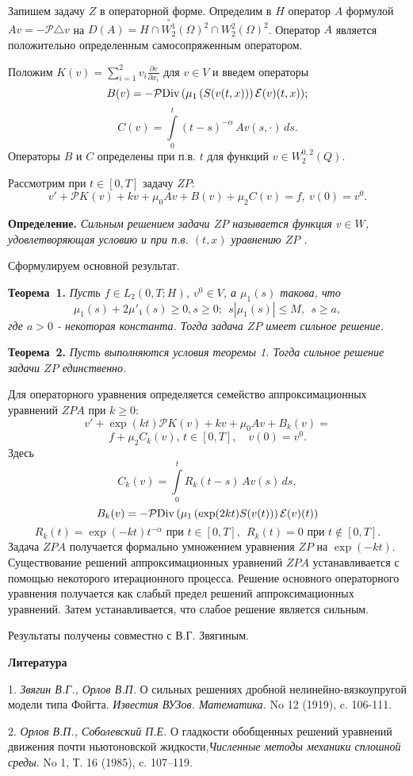 Запишем задачу  $Z$ в операторной форме.
 Определим в $H$ оператор $A$ формулой $Av=-{\mathcal{P}}\triangle v$ на $D(A)=H \cap \stackrel{\circ}{W_2^1}(\Omega)^2\cap {W_2^2}(\Omega)^2$. Оператор $A$ является  положительно определенным самосопряженным оператором.

Положим
$K(v)=\sum_{i=1}^2 v_i\frac{\partial v}{\partial x_i}$ для $v\in V$ и введем операторы
$$
B(v) = - {\mathcal{P}}{\rm Div} \, (\mu_1\,(S(v(t,x)))\,\mathcal{E}(v)(t,x));
$$
$$ C(v)=\int\limits_{0}^t(t-s)^{-\alpha}\,A v(s, \cdot )\,ds.
$$
Операторы $B$ и
$C$ определены при п.в. $t$ для функций $v\in W_2^{0,2}(Q)$.

Рассмотрим  при  $ t\in[0,T]$ задачу $ZP$:
$$
v'+\mathcal{P}K_{}( v)+ k v+\mu_0 Av +B(v)+\mu_2C(v)= f,\    v(0)=v^0.
$$


\textbf{Определение.} {\it
Сильным решением задачи $ZP$ называется функция $v\in W$, удовлетворяющая условию  и при п.в. $(t,x)$ уравнению   $ZP$ .}

Сформулируем основной результат.

\textbf{Теорема~1.} {\it Пусть  $f\in L_2 (0,T;H)$, $v^0\in V$, а $\mu_1(s)$ такова, что
$$
 \mu_1(s)+2\mu'_1(s)\ge 0, s\ge 0; \ \ s|\mu_1(s)|\le M,\ \ s\ge a,
$$
где $a>0$ - некоторая константа. Тогда задача  $ZP$  имеет сильное решение.}


\textbf{Теорема~2.} {\it Пусть  выполняются условия теоремы 1.
Тогда сильное решение задачи  $ZP$  единственно.}

 Для операторного уравнения
определяется семейство аппроксимационных уравнений $ZPA$ при $k\ge 0$:
$$
v'+\exp(kt)\mathcal{P}K(v)+ k v+\mu_0 Av +B_k(v)=
$$
$$
f+\mu_2 C_k(v),\, t\in[0,T], \quad   v(0)=v^0.
$$
Здесь
$$
C_k(v)=\int\limits_{0}^tR_k(t-s)\,A v(s)\,ds,
$$
$$
B_k(v) = - {\mathcal{P}}{\rm Div} \, (\mu_1\,(\exp(2kt)S(v(t)))\,\mathcal{E}(v)(t))
$$
$$
R_k(t)=\exp(-kt)t^{-\alpha} \mbox{ при  } t\in[0,T],\ \  R_k(t)=0  \mbox{ при  } t\notin[0,T].
$$
 Задача $ZPA$  получается  формально умножением уравнения $ZP$  на  $\exp(-kt)$.
 Существование
решений аппроксимационных уравнений $ZPA$ устанавливается с помощью
некоторого итерационного процесса. Решение основного операторного уравнения получается как
слабый предел решений аппроксимационных уравнений. Затем устанавливается, что слабое решение является сильным.




Результаты получены совместно с В.Г. Звягиным.



\smallskip \centerline {\bf Литература} \nopagebreak

1. {\it Звягин В.Г., Орлов В.П.} О сильных решениях дроб\-ной не\-линейно-вязкоупругой модели типа Фойгта.  {\it Известия \newline ВУЗов. Математика.} No 12 (1919), c. 106-111.

2. {\it Орлов В.П., Соболевский П.Е.} О гладкости обоб\-щен\-ных решений уравнений движения почти ньютоновской  \newline жидкости,{\it  Численные методы механики сплошной среды}.  \newline No 1, Т. 16  (1985), c. 107--119.

